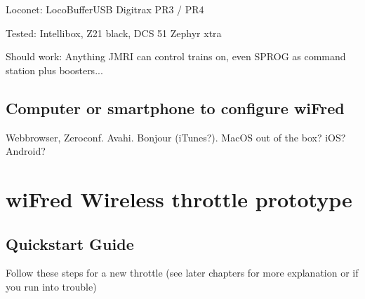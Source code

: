 \documentclass[11pt,a4paper]{scrartcl}
\begin{document}
Loconet:
LocoBufferUSB
Digitrax PR3 / PR4

Tested: Intellibox, Z21 black, DCS 51 Zephyr xtra

Should work: Anything JMRI can control trains on, even SPROG as command station plus boosters...

\subsection{Computer or smartphone to configure wiFred} \label{configurationComputer}

Webbrowser, Zeroconf. Avahi. Bonjour (iTunes?). MacOS out of the box? iOS? Android?

\clearpage

\section{wiFred Wireless throttle prototype} \label{oldThrottle}

\subsection{Quickstart Guide}

Follow these steps for a new throttle (see later chapters for more explanation or if you run into trouble)
\end{document}
